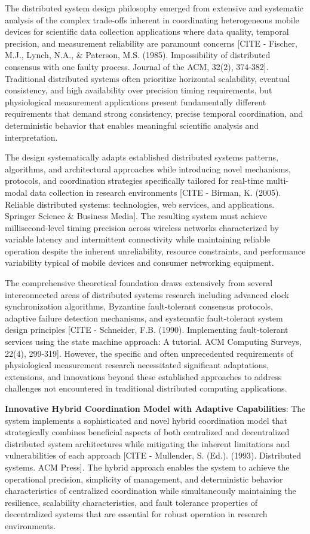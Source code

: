 \documentclass[12pt,a4paper]{article}
\begin{document}
The distributed system design philosophy emerged from extensive and systematic analysis of the complex trade-offs
inherent in coordinating heterogeneous mobile devices for scientific data collection applications where data quality,
temporal precision, and measurement reliability are paramount
concerns [CITE - Fischer, M.J., Lynch, N.A., \& Paterson, M.S. (1985). Impossibility of distributed consensus with one faulty process. Journal of the ACM, 32(2), 374-382].
Traditional distributed systems often prioritize horizontal scalability, eventual consistency, and high availability
over precision timing requirements, but physiological measurement applications present fundamentally different
requirements that demand strong consistency, precise temporal coordination, and deterministic behavior that enables
meaningful scientific analysis and interpretation.

The design systematically adapts established distributed systems patterns, algorithms, and architectural approaches
while introducing novel mechanisms, protocols, and coordination strategies specifically tailored for real-time
multi-modal data collection in research
environments [CITE - Birman, K. (2005). Reliable distributed systems: technologies, web services, and applications. Springer Science \& Business Media].
The resulting system must achieve millisecond-level timing precision across wireless networks characterized by variable
latency and intermittent connectivity while maintaining reliable operation despite the inherent unreliability, resource
constraints, and performance variability typical of mobile devices and consumer networking equipment.

The comprehensive theoretical foundation draws extensively from several interconnected areas of distributed systems
research including advanced clock synchronization algorithms, Byzantine fault-tolerant consensus protocols, adaptive
failure detection mechanisms, and systematic fault-tolerant system design
principles [CITE - Schneider, F.B. (1990). Implementing fault-tolerant services using the state machine approach: A tutorial. ACM Computing Surveys, 22(4), 299-319].
However, the specific and often unprecedented requirements of physiological measurement research necessitated
significant adaptations, extensions, and innovations beyond these established approaches to address challenges not
encountered in traditional distributed computing applications.

\textbf{Innovative Hybrid Coordination Model with Adaptive Capabilities}: The system implements a sophisticated and novel
hybrid coordination model that strategically combines beneficial aspects of both centralized and decentralized
distributed system architectures while mitigating the inherent limitations and vulnerabilities of each
approach [CITE - Mullender, S. (Ed.). (1993). Distributed systems. ACM Press]. The hybrid approach enables the system to
achieve the operational precision, simplicity of management, and deterministic behavior characteristics of centralized
coordination while simultaneously maintaining the resilience, scalability characteristics, and fault tolerance
properties of decentralized systems that are essential for robust operation in research environments.
\end{document}
